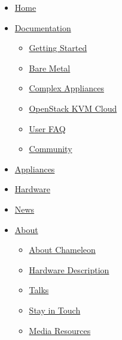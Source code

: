 \FILENAME

\hypertarget{main-nav}{}
\begin{itemize}
\item
  \href{https://www.chameleoncloud.org/}{Home}
\item
  \href{openstack-kvm-user-guide.html\#}{Documentation }

  \begin{itemize}
    \item
    \href{https://www.chameleoncloud.org/docs/getting-started/}{Getting
    Started}
  \item
    \href{https://www.chameleoncloud.org/docs/bare-metal-user-guide/}{Bare
    Metal}
  \item
    \href{https://www.chameleoncloud.org/docs/complex-appliances/}{Complex
    Appliances}
  \item
    \href{https://www.chameleoncloud.org/docs/openstack-kvm-cloud/}{OpenStack
    KVM Cloud}
  \item
    \href{https://www.chameleoncloud.org/docs/user-faq/}{User FAQ}
  \item
    \href{https://www.chameleoncloud.org/docs/community/}{Community}
  \end{itemize}
\item
  \href{https://www.chameleoncloud.org/appliances/}{Appliances}
\item
  \href{https://www.chameleoncloud.org/hardware/}{Hardware}
\item
  \href{https://www.chameleoncloud.org/news/}{News}
\item
  \href{openstack-kvm-user-guide.html\#}{About }

  \begin{itemize}
    \item
    \href{https://www.chameleoncloud.org/about/chameleon/}{About
    Chameleon}
  \item
    \href{https://www.chameleoncloud.org/about/hardware-description/}{Hardware
    Description}
  \item
    \href{https://www.chameleoncloud.org/talks/}{Talks}
  \item
    \href{https://www.chameleoncloud.org/about/newsletter/}{Stay in
    Touch}
  \item
    \href{https://www.chameleoncloud.org/about/media-resources/}{Media
    Resources}
  \end{itemize}
\end{itemize}

